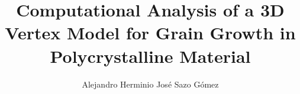 \documentclass[letterpaper,oneside,12pt,english]{book}
\title{Computational Analysis of a 3D Vertex Model for Grain Growth in Polycrystalline Material}
\author{Alejandro Herminio José Sazo Gómez}
\renewcommand{\appendixname}{Anexo}
\renewcommand{\appendixtocname}{Anexo}
\renewcommand{\appendixpagename}{Anexo}
\begin{document}
\frontmatter
 
%
% 
% 
\markboth{}{}
\tableofcontents 
\listoftables
\listoffigures
\listofalgorithms
\renewcommand{\sectionmark}[1]{\markright{\thesection\ #1}}

\mainmatter
%



%
%
%
%
%




%
%



%
\end{document}
